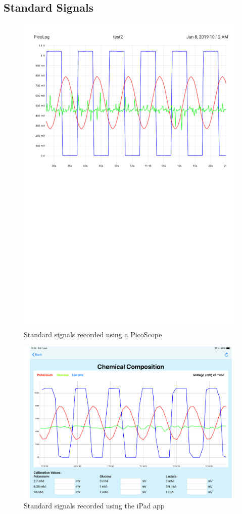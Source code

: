 \subsection{Standard Signals}

\begin{figure}[h!]
\centering
\includegraphics[trim={0cm 0cm 0cm  0cm}, clip, width=.9\textwidth]{./figures/standardsignals/picologChemComp.pdf}
\captionsetup{justification=centering}
\caption{Standard signals recorded using a PicoScope}
\label{fig: test1 picolog}
\end{figure}

\begin{figure}[h!]
\centering
\includegraphics[trim={0cm 0cm 0cm  0cm}, clip, width=.9\textwidth]{./figures/standardsignals/appChemComp.pdf}
\captionsetup{justification=centering}
\caption{Standard signals recorded using the iPad app}
\label{fig: test1 app}
\end{figure}

